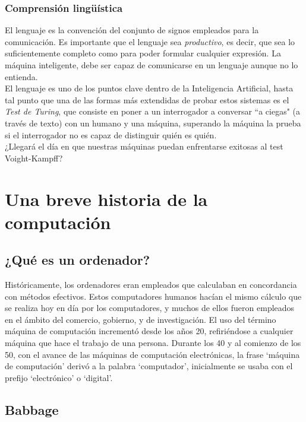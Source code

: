 \documentclass[a4paper]{article}
\begin{document}
    \subsubsection*{Comprensión lingüística}

    El lenguaje es la convención del conjunto de signos empleados para la comunicación. Es importante que el lenguaje sea \emph{productivo}, es decir, que sea lo suficientemente completo como para poder formular cualquier expresión. La máquina inteligente, debe ser capaz de comunicarse en un lenguaje aunque no lo entienda.\\

    El lenguaje es uno de los puntos clave dentro de la Inteligencia Artificial, hasta tal punto que una de las formas más extendidas de probar estos sistemas es el \emph{Test de Turing}, que consiste en poner a un interrogador a conversar ``a ciegas" (a través de texto) con un humano y una máquina, superando la máquina la prueba si el interrogador no es capaz de distinguir quién es quién.\\

    ¿Llegará el día en que nuestras máquinas puedan enfrentarse exitosas al test Voight-Kampff\cite{VK}?

    \section*{Una breve historia de la computación}

    \subsection*{¿Qué es un ordenador?}

    Históricamente, los ordenadores eran empleados que calculaban en concordancia con métodos efectivos. Estos computadores humanos hacían el mismo cálculo que se realiza hoy en día por los computadores, y muchos de ellos fueron empleados en el ámbito del comercio, gobierno, y de investigación. El uso del término máquina de computación incrementó desde los años 20, refiriéndose a cualquier máquina que hace el trabajo de una persona. Durante los 40 y al comienzo de los 50, con el avance de las máquinas de computación electrónicas, la frase ‘máquina de computación’ derivó a la palabra ‘computador’, inicialmente se usaba con el prefijo ‘electrónico’ o ‘digital’.

    \subsection*{Babbage}
\end{document}
